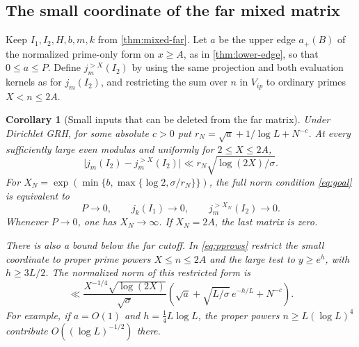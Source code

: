 \documentclass[11pt,a4paper]{article}
\numberwithin{equation}{section}
\newtheorem{corollary}[theorem]{Corollary}
\begin{document}
\subsection{The small coordinate of the far mixed matrix}

Keep $I_1,I_2,H,b,m,k$ from \cref{thm:mixed-far}. Let $a$ be
the upper edge $a_+(B)$ of the normalized prime-only form on
$x\ge A$, as in \cref{thm:lower-edge}, so that $0\le a\le P$.
Define $j_m^{>X}(I_2)$ by using the same projection and both
evaluation kernels as for $j_m(I_2)$, and restricting the sum
over $n$ in $V_{ip}$ to ordinary primes $X<n\le2A$.

\begin{corollary}[Small inputs that can be deleted from the far matrix]
\label{cor:far-small-primes}
Under Dirichlet GRH, for some absolute $c>0$ put
$r_N=\sqrt a+1/\log L+N^{-c}$. At every sufficiently large even
modulus and uniformly for $2\le X\le2A$,
\begin{equation}
 \big|j_m(I_2)-j_m^{>X}(I_2)\big|
 \ll r_N\sqrt{\log(2X)/\sigma}.
 \label{eq:far-small-primes}
\end{equation}
For $X_N=\exp(\min\{b,\max\{\log 2,\sigma/r_N\}\})$, the full
norm condition \eqref{eq:goal} is equivalent to
\[
 P\longrightarrow0,\qquad j_k(I_1)\longrightarrow0,\qquad
 j_m^{>X_N}(I_2)\longrightarrow0 .
\]
Whenever $P\to0$, one has $X_N\to\infty$. If $X_N=2A$, the
last matrix is zero.

There is also a bound below the far cutoff. In \eqref{eq:pprows}
restrict the small coordinate to proper prime powers $X\le n\le2A$
and the large test to $y\ge e^h$, with $h\ge3L/2$. The normalized
norm of this restricted form is
\begin{equation}
 \ll \frac{X^{-1/4}\sqrt{\log(2X)}}{\sqrt\sigma}
       \left(\sqrt a+\sqrt{L/\sigma}\,e^{-h/L}+N^{-c}\right).
 \label{eq:mixed-height-powers}
\end{equation}
For example, if $a=O(1)$ and $h=\tfrac14 L\log L$, the proper
powers $n\ge L(\log L)^4$ contribute $O((\log L)^{-1/2})$ there.
\end{corollary}
\end{document}
